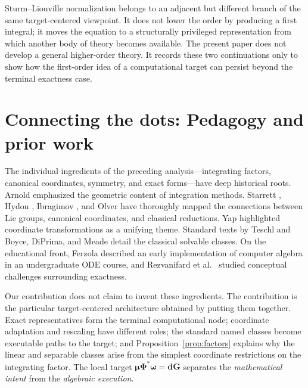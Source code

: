 \documentclass[11pt]{article}
\theoremstyle{definition}
\begin{document}
Sturm--Liouville normalization belongs to an adjacent but different branch of the same target-centered viewpoint. It does not lower the order by producing a first integral; it moves the equation to a structurally privileged representation from which another body of theory becomes available. The present paper does not develop a general higher-order theory. It records these two continuations only to show how the first-order idea of a computational target can persist beyond the terminal exactness case.

\section{Connecting the dots: Pedagogy and prior work}

The individual ingredients of the preceding analysis---integrating factors, canonical coordinates, symmetry, and exact forms---have deep historical roots. Arnold \cite{Arnold1992} emphasized the geometric content of integration methods. Starrett \cite{Starrett2007}, Hydon \cite{Hydon2000}, Ibragimov \cite{Ibragimov1999}, and Olver \cite{Olver1993} have thoroughly mapped the connections between Lie groups, canonical coordinates, and classical reductions. Yap \cite{Yap2010} highlighted coordinate transformations as a unifying theme. Standard texts by Teschl \cite{Teschl2012} and Boyce, DiPrima, and Meade \cite{Boyce2017} detail the classical solvable classes. On the educational front, Ferzola \cite{Ferzola1994} described an early implementation of computer algebra in an undergraduate ODE course, and Rezvanifard et al.\ \cite{Rezvanifard2023} studied conceptual challenges surrounding exactness. 

Our contribution does not claim to invent these ingredients. The contribution is the particular target-centered architecture obtained by putting them together. Exact representatives form the terminal computational node; coordinate adaptation and rescaling have different roles; the standard named classes become executable paths to the target; and Proposition~\ref{prop:factors} explains why the linear and separable classes arise from the simplest coordinate restrictions on the integrating factor. The local target \(\mathbf{\mu\Phi^*\omega=dG}\) separates the \emph{mathematical intent} from the \emph{algebraic execution}.
\end{document}
